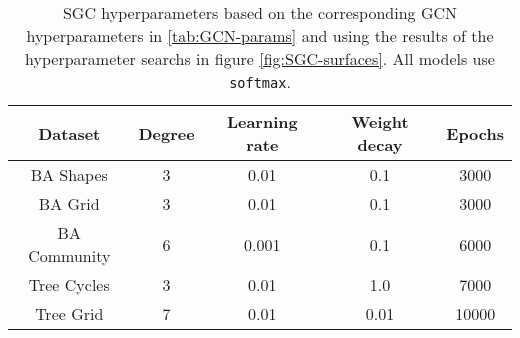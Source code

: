 \begin{table}[h]
    \centering
    \captionsetup{width=.9\textwidth}
    \begin{tabular}{c|cccc}
        \textbf{Dataset} &
        \textbf{Degree} &
        \textbf{Learning rate} &
        \textbf{Weight decay} &
        \textbf{Epochs} \\
        \midrule
        BA Shapes       & 3 & 0.01 & 0.1 & 3000 \\
        BA Grid         & 3 & 0.01 & 0.1 & 3000 \\
        BA Community    & 6 & 0.001 & 0.1 & 6000 \\
        Tree Cycles     & 3 & 0.01 & 1.0 & 7000 \\
        Tree Grid       & 7 & 0.01 & 0.01 & 10000 \\
    \end{tabular}
    \caption{SGC hyperparameters based on the corresponding GCN hyperparameters in \ref{tab:GCN-params} and using the results of the hyperparameter searchs in figure \ref{fig:SGC-surfaces}. All models use \texttt{softmax}.}
    \label{tab:SGC-params}
\end{table}


